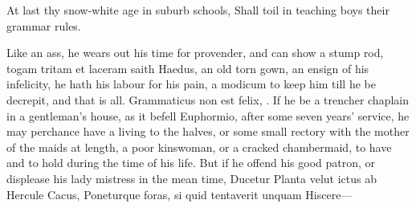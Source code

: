 {{At last thy snow-white age in suburb schools,
Shall toil in teaching boys their grammar rules.

Like an ass, he wears out his time for provender, and can show a stump
rod, togam tritam et laceram saith Haedus, an old torn gown, an
ensign of his infelicity, he hath his labour for his pain, a modicum to
keep him till he be decrepit, and that is all. Grammaticus non est
felix, \etc{}. If he be a trencher chaplain in a gentleman's house, as it
befell  Euphormio, after some seven years' service, he may
perchance have a living to the halves, or some small rectory with the
mother of the maids at length, a poor kinswoman, or a cracked
chambermaid, to have and to hold during the time of his life. But if he
offend his good patron, or displease his lady mistress in the mean
time,
Ducetur Planta velut ictus ab Hercule Cacus,
Poneturque foras, si quid tentaverit unquam
Hiscere---

}}
